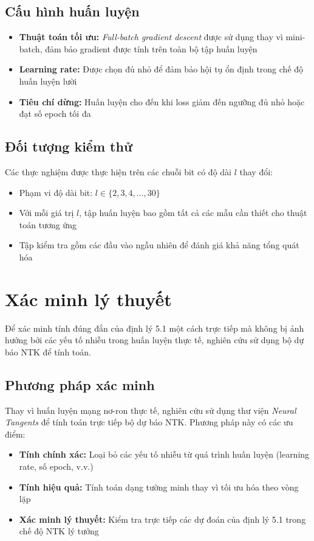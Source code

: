 \subsection{Cấu hình huấn luyện}

\begin{itemize}
    \item \textbf{Thuật toán tối ưu:} \textit{Full-batch gradient descent} được sử dụng thay vì mini-batch, đảm bảo gradient được tính trên toàn bộ tập huấn luyện
    \item \textbf{Learning rate:} Được chọn đủ nhỏ để đảm bảo hội tụ ổn định trong chế độ huấn luyện lười
    \item \textbf{Tiêu chí dừng:} Huấn luyện cho đến khi loss giảm đến ngưỡng đủ nhỏ hoặc đạt số epoch tối đa
\end{itemize}

\subsection{Đối tượng kiểm thử}

Các thực nghiệm được thực hiện trên các chuỗi bit có độ dài $l$ thay đổi:
\begin{itemize}
    \item Phạm vi độ dài bit: $l \in \{2, 3, 4, \ldots, 30\}$
    \item Với mỗi giá trị $l$, tập huấn luyện bao gồm tất cả các mẫu cần thiết cho thuật toán tương ứng
    \item Tập kiểm tra gồm các đầu vào ngẫu nhiên để đánh giá khả năng tổng quát hóa
\end{itemize}

\section{Xác minh lý thuyết}

Để xác minh tính đúng đắn của định lý 5.1 một cách trực tiếp mà không bị ảnh hưởng bởi các yếu tố nhiễu trong huấn luyện thực tế, nghiên cứu sử dụng bộ dự báo NTK để tính toán.

\subsection{Phương pháp xác minh}

Thay vì huấn luyện mạng nơ-ron thực tế, nghiên cứu sử dụng thư viện \textit{Neural Tangents} để tính toán trực tiếp bộ dự báo NTK. Phương pháp này có các ưu điểm:
\begin{itemize}
    \item \textbf{Tính chính xác:} Loại bỏ các yếu tố nhiễu từ quá trình huấn luyện (learning rate, số epoch, v.v.)
    \item \textbf{Tính hiệu quả:} Tính toán dạng tường minh thay vì tối ưu hóa theo vòng lặp
    \item \textbf{Xác minh lý thuyết:} Kiểm tra trực tiếp các dự đoán của định lý 5.1 trong chế độ NTK lý tưởng
\end{itemize}

